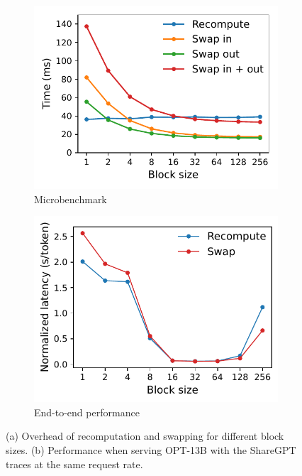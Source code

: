 \documentclass[sigplan,10pt]{acmart}
\begin{document}
\begin{figure}[t]
     \centering
     \begin{subfigure}[t]{0.48\linewidth}
         \centering         \includegraphics[width=.9\columnwidth]{figures/experiments/micro-swap.pdf}
         \vspace{-7pt}
         \caption{Microbenchmark\label{fig:recomp-vs-swap-micro}}
         
     \end{subfigure}
     \begin{subfigure}[t]{0.48\linewidth}
         \centering        \includegraphics[width=.9\columnwidth]{figures/experiments/recompute-vs-swap.pdf}
         \vspace{-7pt}
         \caption{End-to-end performance\label{fig:recomp-vs-swap-e2e}}
     \end{subfigure}
     \vspace{-3pt}
     \caption{(a) Overhead of recomputation and swapping for different block sizes. (b) Performance when serving OPT-13B with the ShareGPT traces at the same request rate.}
     \vspace{-5pt}
\label{fig:recompute-vs-swap}
\end{figure}
\end{document}
